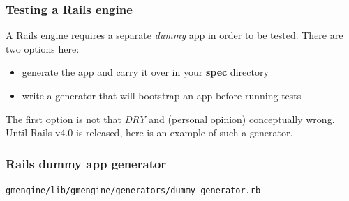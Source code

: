 \documentclass[compress]{beamer}
\begin{document}
\begin{frame}
\frametitle{Testing a Rails engine}

A Rails engine requires a separate \emph{dummy} app in order to be tested.
There are two options here:
\begin{itemize}
  \item generate the app and carry it over in your \textbf{spec} directory
  \item write a generator that will bootstrap an app before running tests
\end{itemize}

The first option is not that \emph{DRY} and (personal opinion) conceptually wrong.
Until Rails v4.0 is released, here is an example of such a generator.
\end{frame}

\begin{frame}
\frametitle{Rails dummy app generator}

\texttt{gmengine/lib/gmengine/generators/dummy\_generator.rb}
\inputminted[fontsize=\tiny,gobble=0,linenos=true,firstline=0,lastline=0]{ruby}{code/gmengine/lib/gmengine/generators/dummy_generator.rb}
\end{frame}
\end{document}
